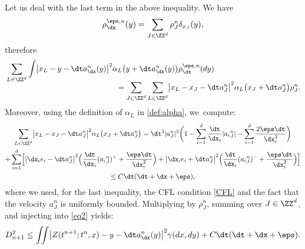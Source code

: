 Let us deal with the last term in the above inequality.
We have\vspace*{-3pt}
\[
\rho_{\dx}^{\eps,n}(y) = \sum_{J\in\ZZ^d} \rho_J^n \delta_{x_J}(y),
\]
therefore\vspace*{-3pt}
\begin{align*}
&\sum_{L\in \ZZ^d} \int \bigl|x_L-y-\dt a^n_{\dx}(y)\bigr|^2 \alpha_L\bigl(y+\dt a^n_{\dx}(y)\bigr) \rho_{\dx}^{\eps,n}(dy) \\[-5pt]
&\hspace{5cm} = \sum_{J\in \ZZ^d} \sum_{L\in \ZZ^d} \bigl|x_L-x_J-\dt a^n_J\bigr|^2 \alpha_L\bigl(x_J+\dt a^n_J\bigr) \rho_J^n.
\end{align*}
Moreover, using the definition of $\alpha_L$ in \eqref{def:alpha}, we~compute:\vspace*{-5pt}
\begin{multline*}
\sum_{L\in \ZZ^d} \bigl|x_L-x_J-\dt a^n_J\bigr|^2 \alpha_L\bigl(x_J+\dt a^n_J\bigr)
= \dt^2 |a_J^n|^2 \biggl(1-\sum_{i=1}^d \frac{\dt}{\dx_i} |{a_i}_J^n| - \sum_{i=1}^d \frac{2\eps\dt}{\dx_i^2}\biggr) \\
+ \sum_{i=1}^d \Bigl[ \bigl|\dx_i e_i -\dt a^n_J\bigr|^2 \Big(\frac{\dt}{\dx_i} ({a_i}_J^n)^+ + \frac{\eps\dt}{\dx_i^2}\Big)+
\bigl|\dx_i e_i +\dt a^n_J\bigr|^2 \Big(\frac{\dt}{\dx_i} ({a_i}_J^n)^- + \frac{\eps\dt}{\dx_i^2}\Big) \Bigr] \\
\leq C\dt(\dt + \dx + \eps),
\end{multline*}
where we used, for the last inequality, the CFL condition \eqref{CFL} and the fact that the velocity $a_J^n$ is uniformly bounded. Multiplying by $\rho_J^n$, summing over $J \in \ZZ^d$, and injecting into \eqref{eq2} yields:
\begin{equation}\label{eqD1}
D_{n+1}^2 \leq \iint \bigl|Z(t^{n+1};t^n,x)-y-\dt a^n_{\dx}(y)\bigr|^2 \gamma(dx,dy) + C \dt (\dt+\dx+\eps).
\end{equation}

